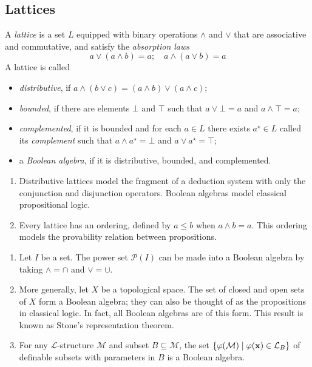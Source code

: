 \subsection{Lattices}
\begin{definition}
    A \emph{lattice} is a set \( L \) equipped with binary operations \( \wedge \) and \( \vee \) that are associative and commutative, and satisfy the \emph{absorption laws}
    \[ a \vee (a \wedge b) = a;\quad a \wedge (a \vee b) = a \]
    A lattice is called
    \begin{itemize}
        \item \emph{distributive}, if \( a \wedge (b \vee c) = (a \wedge b) \vee (a \wedge c) \);
        \item \emph{bounded}, if there are elements \( \bot \) and \( \top \) such that \( a \vee \bot = a \) and \( a \wedge \top = a \);
        \item \emph{complemented}, if it is bounded and for each \( a \in L \) there exists \( a^\star \in L \) called its \emph{complement} such that \( a \wedge a^\star = \bot \) and \( a \vee a^\star = \top \);
        \item a \emph{Boolean algebra}, if it is distributive, bounded, and complemented.
    \end{itemize}
\end{definition}
\begin{remark}
    \begin{enumerate}
        \item Distributive lattices model the fragment of a deduction system with only the conjunction and disjunction operators.
        Boolean algebras model classical propositional logic.
        \item Every lattice has an ordering, defined by \( a \leq b \) when \( a \wedge b = a \).
        This ordering models the provability relation between propositions.
    \end{enumerate}
\end{remark}
\begin{example}
    \begin{enumerate}
        \item Let \( I \) be a set.
        The power set \( \mathcal P(I) \) can be made into a Boolean algebra by taking \( \wedge = \cap \) and \( \vee = \cup \).
        \item More generally, let \( X \) be a topological space.
        The set of closed and open sets of \( X \) form a Boolean algebra; they can also be thought of as the propositions in classical logic.
        In fact, all Boolean algebras are of this form.
        This result is known as Stone's representation theorem.
        \item For any \( \mathcal L \)-structure \( \mathcal M \) and subset \( B \subseteq \mathcal M \), the set \( \qty{\varphi(\mathcal M) \mid \varphi(\vb x) \in \mathcal L_B} \) of definable subsets with parameters in \( B \) is a Boolean algebra.
    \end{enumerate}
\end{example}

